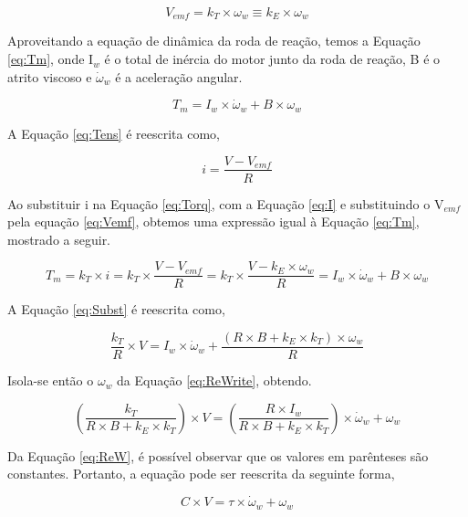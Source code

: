 \documentclass[
	12pt,				%
	openany,			%
	twoside,			%
	a4paper,			%
	english,			%
	french,				%
	spanish,			%
	brazil,				%
	oldfontcommands
	]{abntex2}
\begin{document}
\begin{equation}
V_{emf} = k_{T} \times \omega_{w} \equiv k_{E} \times \omega_{w}
\label{eq:Vemf}
\end{equation}

Aproveitando a equação de dinâmica da roda de reação, temos a Equação \ref{eq:Tm}, onde I$_{w}$ é o total de inércia do motor junto da roda de reação, B é o atrito viscoso e $\dot{\omega}_{w}$ é a aceleração angular.

\begin{equation}
T_{m} = I_{w} \times \dot{\omega}_{w} + B \times \omega_{w}
\label{eq:Tm}
\end{equation}

A Equação \ref{eq:Tens} é reescrita como,

\begin{equation}
i = \frac{V - V_{emf}}{R}
\label{eq:I}
\end{equation}

Ao substituir i na Equação \ref{eq:Torq}, com a Equação \ref{eq:I} e substituindo o V$_{emf}$ pela equação \ref{eq:Vemf}, obtemos uma expressão igual à Equação \ref{eq:Tm}, mostrado a seguir.

\begin{equation}
T_{m} = k_{T} \times i = k_{T} \times \frac{V - V_{emf}}{R} = k_{T} \times \frac{ V - k_{E} \times \omega_{w} }{R} = I_{w} \times \dot{\omega}_{w} + B \times \omega_{w}
\label{eq:Subst}
\end{equation}

A Equação \ref{eq:Subst} é reescrita como,

\begin{equation}
\frac{k_{T}}{R} \times V = I_{w} \times \dot{\omega}_{w} + \frac{(R \times B + k_{E} \times k_{T}) \times \omega_{w} }{R}
\label{eq:ReWrite}
\end{equation}

Isola-se então o $\omega_{w}$ da Equação \ref{eq:ReWrite}, obtendo.

\begin{equation}
\left( \frac{k_{T}}{R \times B + k_{E} \times k_{T}} \right) \times V = \left( \frac{R \times I_{w}}{R \times B + k_{E} \times k_{T}} \right) \times \dot{\omega}_{w} + \omega_{w}
\label{eq:ReW}
\end{equation}

Da Equação \ref{eq:ReW}, é possível observar que os valores em parênteses são constantes. Portanto, a equação pode ser reescrita da seguinte forma,

\begin{equation}
C \times V = \tau \times \dot{\omega}_{w} + \omega_{w}
\label{eq:RWDM}
\end{equation}
\end{document}
